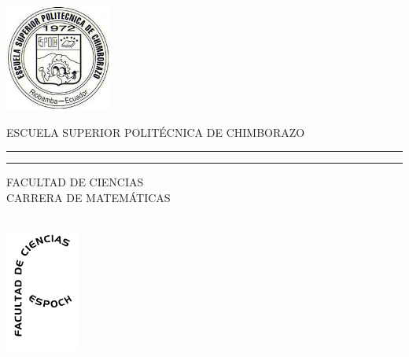 \documentclass[12pt,a4paper]{article}
\author{César Daniel Reinoso Reinoso Reinoso}
\begin{document}
\begin{titlepage}
    \thispagestyle{empty}
    \begin{minipage}[c][0.17\textheight][c]{0.25\textwidth}
        \begin{center}
            \includegraphics[width=3.5cm, height=3.5cm]{images.jpg}
        \end{center}
    \end{minipage}
    \begin{minipage}[c][0.195\textheight][t]{0.75\textwidth}
        \begin{center}
            \vspace{0.3cm}
            \textsc{\large ESCUELA SUPERIOR POLITÉCNICA DE CHIMBORAZO}\\[0.5cm]
            \vspace{0.3cm}
            \hrule height2.5pt
            \vspace{.2cm}
            \hrule height1pt
            \vspace{.8cm}
            \textsc{FACULTAD DE CIENCIAS\\
                CARRERA DE MATEMÁTICAS }\\[0.5cm] %
        \end{center}
    \end{minipage}

    \begin{minipage}[c][0.81\textheight][t]{0.25\textwidth}
        \vspace*{5mm}
        \begin{center}
            \hskip2.0mm
            \vrule width1pt height13cm
            \vspace{5mm}
            \hskip2pt
            \vrule width2.5pt height13cm
            \hskip2mm
            \vrule width1pt height13cm \\
            \vspace{5mm}
            \includegraphics[height=4.0cm]{logo-blanco (1).png}
        \end{center}
    \end{minipage}
    \begin{minipage}[c][0.81\textheight][t]{0.75\textwidth}
        \begin{center}
            \vspace{1cm}


\end{center}
\end{minipage}
\end{titlepage}
\end{document}
